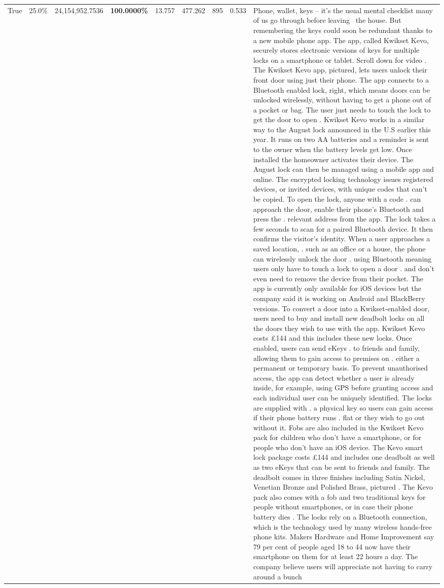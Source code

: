 \begin{table}[H]
\begin{tabular}{lllrlllll}
True & 25.0\% & 24,154,952.7536 & \bfseries \color{red} 100.0000\% & 13.757 & 477.262 & 895 & 0.533 & Phone, wallet, keys – it’s the usual mental checklist many of us go through before leaving  the house. But remembering the keys could soon be redundant thanks to a new mobile phone app. The app, called Kwikset Kevo, securely stores electronic versions of keys for multiple locks on a smartphone or tablet. Scroll down for video . The Kwikset Kevo app, pictured, lets users unlock their front door using just their phone. The app connects to a Bluetooth enabled lock, right, which means doors can be unlocked wirelessly, without having to get a phone out of a pocket or bag. The user just needs to touch the lock to get the door to open . Kwikset Kevo works in a similar way to the August lock announced in the U.S earlier this year. It runs on two AA batteries and a reminder is sent to the owner when the battery levels get low. Once installed the homeowner activates their device. The August lock can then be managed using a mobile app and online. The encrypted locking technology issues registered devices, or invited devices, with unique codes that can't be copied. To open the lock, anyone with a code . can approach the door, enable their phone's Bluetooth and press the . relevant address from the app. The lock takes a few seconds to scan for a paired Bluetooth device. It then confirms the visitor's identity. When a user approaches a saved location, . such as an office or a house, the phone can wirelessly unlock the door . using Bluetooth meaning users only have to touch a lock to open a door . and don't even need to remove the device from their pocket. The app is currently only available for iOS devices but the company said it is working on Android and BlackBerry versions. To convert a door into a Kwikset-enabled door, users need to buy and install new deadbolt locks on all the doors they wish to use with the app. Kwikset Kevo costs £144 and this includes these new locks. Once enabled, users can send eKeys . to friends and family, allowing them to gain access to premises on . either a permanent or temporary basis. To prevent unauthorised access, the app can detect whether a user is already inside, for example, using GPS before granting access and each individual user can be uniquely identified. The locks are supplied with . a physical key so users can gain access if their phone battery runs . flat or they wish to go out without it. Fobs are also included in the Kwikset Kevo pack for children who don't have a smartphone, or for people who don't have an iOS device. The Kevo smart lock package costs £144 and includes one deadbolt as well as two eKeys that can be sent to friends and family. The deadbolt comes in three finishes including Satin Nickel, Venetian Bronze and Polished Brass, pictured . The Kevo pack also comes with a fob and two traditional keys for people without smartphones, or in case their phone battery dies . The locks rely on a Bluetooth connection, which is the technology used by many wireless hands-free phone kits. Makers Hardware and Home Improvement say 79 per cent of people aged 18 to 44 now have their smartphone on them for at least 22 hours a day. The company believe users will appreciate not having to carry around a bunch 
\end{tabular}
\end{table}
